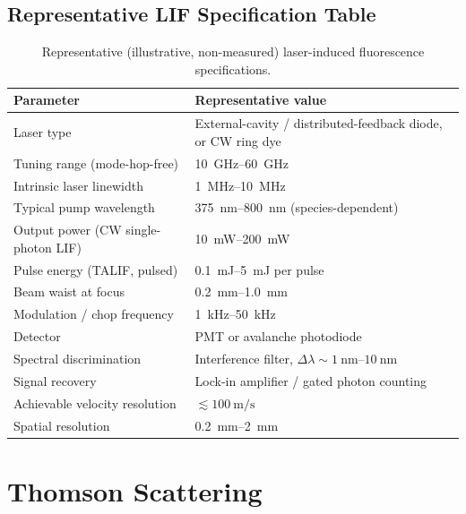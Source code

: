 \subsection{Representative LIF Specification Table}

\begin{table}[htbp]
\centering
\caption{Representative (illustrative, non-measured) laser-induced fluorescence specifications.}
\label{tab:lif-specs}
\begin{tabular}{@{}ll@{}}
\toprule
Parameter & Representative value \\
\midrule
Laser type & External-cavity / distributed-feedback diode, or CW ring dye \\
Tuning range (mode-hop-free) & \SIrange{10}{60}{\giga\hertz} \\
Intrinsic laser linewidth & \SIrange{1}{10}{\mega\hertz} \\
Typical pump wavelength & \SIrange{375}{800}{\nano\meter} (species-dependent) \\
Output power (CW single-photon LIF) & \SIrange{10}{200}{\milli\watt} \\
Pulse energy (TALIF, pulsed) & \SIrange{0.1}{5}{\milli\joule} per pulse \\
Beam waist at focus & \SIrange{0.2}{1.0}{\milli\meter} \\
Modulation / chop frequency & \SIrange{1}{50}{\kilo\hertz} \\
Detector & PMT or avalanche photodiode \\
Spectral discrimination & Interference filter, $\Delta\lambda \sim \SIrange{1}{10}{\nano\meter}$ \\
Signal recovery & Lock-in amplifier / gated photon counting \\
Achievable velocity resolution & $\lesssim \SI{100}{\meter\per\second}$ \\
Spatial resolution & \SIrange{0.2}{2}{\milli\meter} \\
\bottomrule
\end{tabular}
\end{table}

\section{Thomson Scattering}
\label{sec:specs-thomson}

